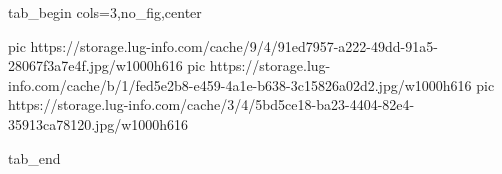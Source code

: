  
 
 
 
 


\ifcmt
  tab_begin cols=3,no_fig,center

     pic https://storage.lug-info.com/cache/9/4/91ed7957-a222-49dd-91a5-28067f3a7e4f.jpg/w1000h616%
		 pic https://storage.lug-info.com/cache/b/1/fed5e2b8-e459-4a1e-b638-3c15826a02d2.jpg/w1000h616%
		 pic https://storage.lug-info.com/cache/3/4/5bd5ce18-ba23-4404-82e4-35913ca78120.jpg/w1000h616%

  tab_end
\fi
